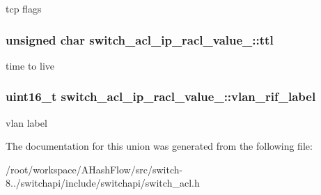 tcp flags \hypertarget{unionswitch__acl__ip__racl__value___a535bac7d00079c64c5682630caca7a60}{
\subsubsection[{ttl}]{\setlength{\rightskip}{0pt plus 5cm}unsigned char switch\+\_\+acl\+\_\+ip\+\_\+racl\+\_\+value\+\_\+\+::ttl}}\label{unionswitch__acl__ip__racl__value___a535bac7d00079c64c5682630caca7a60}
time to live \hypertarget{unionswitch__acl__ip__racl__value___a41e9fbb598ff26c97f7276fcfbbcbfdb}{
\subsubsection[{vlan\+\_\+rif\+\_\+label}]{\setlength{\rightskip}{0pt plus 5cm}uint16\+\_\+t switch\+\_\+acl\+\_\+ip\+\_\+racl\+\_\+value\+\_\+\+::vlan\+\_\+rif\+\_\+label}}\label{unionswitch__acl__ip__racl__value___a41e9fbb598ff26c97f7276fcfbbcbfdb}
vlan label 

The documentation for this union was generated from the following file\+:\begin{DoxyCompactItemize}
\item 
/root/workspace/\+A\+Hash\+Flow/src/switch-\/8../switchapi/include/switchapi/switch\+\_\+acl.\+h\end{DoxyCompactItemize}

